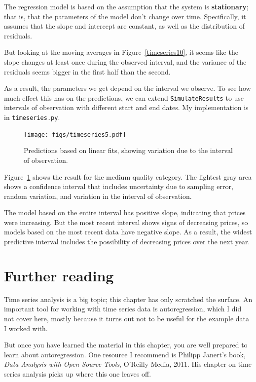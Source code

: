 \documentclass[12pt]{book}
\theoremstyle{exercise}
\begin{document}
The regression model is based on the assumption that the system
is {\bf stationary}; that is, that the parameters of the model
don't change over time.
Specifically, it assumes that the slope and
intercept are constant, as well as the distribution of residuals.%
%

But looking at the moving averages in Figure~\ref{timeseries10}, it
seems like the slope changes at least once during the observed
interval, and the variance of the residuals seems bigger in the first
half than the second.%

As a result, the parameters we get depend on the interval we
observe.  To see how much effect this has on the predictions,
we can extend {\tt SimulateResults} to use intervals of observation
with different start and end dates.  My implementation is in
{\tt timeseries.py}.%

\begin{figure}
\centerline{\texttt{[image: figs/timeseries5.pdf]}}
\caption{Predictions based on linear fits, showing
variation due to the interval of observation.}%
\label{timeseries5}
\end{figure}

Figure~\ref{timeseries5} shows the result for the medium quality
category.  The lightest gray area shows a confidence interval that
includes uncertainty due to sampling error, random variation, and
variation in the interval of observation.%
%

The model based on the entire interval has positive slope, indicating
that prices were increasing.  But the most recent interval shows signs
of decreasing prices, so models based on the most recent data have
negative slope.  As a result, the widest predictive interval includes
the possibility of decreasing prices over the next year.%


\section{Further reading}

Time series analysis is a big topic; this chapter has only scratched
the surface.  An important tool for working with time series data
is autoregression, which I did not cover here, mostly because it turns
out not to be useful for the example data I worked with.%

But once you
have learned the material in this chapter, you are well prepared
to learn about autoregression.  One resource I recommend is
Philipp Janert's book, {\it Data Analysis with Open Source Tools},
O'Reilly Media, 2011.  His chapter on time series analysis picks up
where this one leaves off.%
\end{document}
